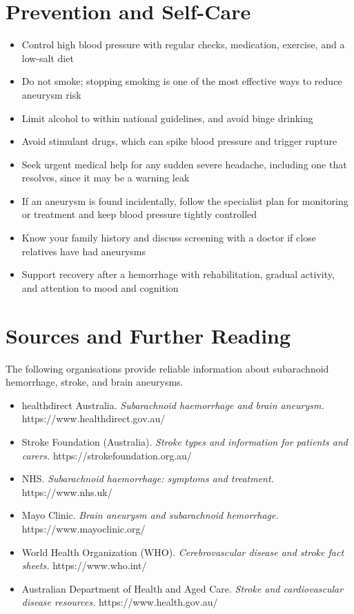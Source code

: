 \section*{Prevention and Self-Care}
\begin{itemize}
    \item Control high blood pressure with regular checks, medication, exercise, and a low-salt diet
    \item Do not smoke; stopping smoking is one of the most effective ways to reduce aneurysm risk
    \item Limit alcohol to within national guidelines, and avoid binge drinking
    \item Avoid stimulant drugs, which can spike blood pressure and trigger rupture
    \item Seek urgent medical help for any sudden severe headache, including one that resolves, since it may be a warning leak
    \item If an aneurysm is found incidentally, follow the specialist plan for monitoring or treatment and keep blood pressure tightly controlled
    \item Know your family history and discuss screening with a doctor if close relatives have had aneurysms
    \item Support recovery after a hemorrhage with rehabilitation, gradual activity, and attention to mood and cognition
\end{itemize}

\section*{Sources and Further Reading}
The following organisations provide reliable information about subarachnoid hemorrhage, stroke, and brain aneurysms.

\begin{itemize}
    \item healthdirect Australia. \textit{Subarachnoid haemorrhage and brain aneurysm.} https://www.healthdirect.gov.au/
    \item Stroke Foundation (Australia). \textit{Stroke types and information for patients and carers.} https://strokefoundation.org.au/
    \item NHS. \textit{Subarachnoid haemorrhage: symptoms and treatment.} https://www.nhs.uk/
    \item Mayo Clinic. \textit{Brain aneurysm and subarachnoid hemorrhage.} https://www.mayoclinic.org/
    \item World Health Organization (WHO). \textit{Cerebrovascular disease and stroke fact sheets.} https://www.who.int/
    \item Australian Department of Health and Aged Care. \textit{Stroke and cardiovascular disease resources.} https://www.health.gov.au/
\end{itemize}

\clearpage
